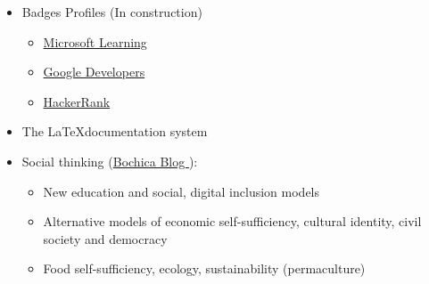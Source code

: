 \documentclass[overlapped,line,final]{res}
\begin{document}
\begin{resume}
\begin{itemize}
\begin{itemize}
		\end{itemize}
	\item Badges Profiles (In construction)
		\begin{itemize}
			\item \href{https://docs.microsoft.com/en-us/users/dtorot/}{Microsoft Learning }
			\item \href{https://developers.google.com/profile/u/117793148623958821230}{Google Developers }
			\item \href{https://www.hackerrank.com/dtorot}{HackerRank }
		\end{itemize}
	\item The \LaTeX documentation system	
	\item Social thinking (\href {https://bochica.org}{Bochica Blog }):
    	\begin{itemize}
		\item New education and social, digital inclusion models
		\item Alternative models of economic self-sufficiency, cultural identity, civil society and democracy
		\item Food self-sufficiency, ecology, sustainability (permaculture)
    	\end{itemize}
			

	
\end{itemize}

\end{resume}
\end{document}
